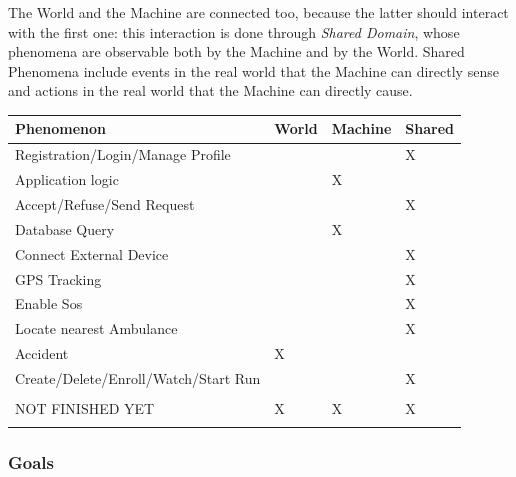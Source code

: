 \documentclass[a4paper]{article}
\begin{document}
        The World and the Machine are connected too, because the latter should interact with the first one: this interaction is done through \textit{Shared Domain}, whose phenomena are observable both by the Machine and by the World. Shared Phenomena include events in the real world that the Machine can directly sense and actions in the real world that the Machine can directly cause.
        \newpage
        \begin{table}[!htpb]
        \centering
        \begin{tabular}{|l|l|l|l|}
        \hline
         \textbf{Phenomenon} & \textbf{World} & \textbf{Machine} & \textbf{Shared}\\ \hline
         Registration/Login/Manage Profile & & & X \\ \hline
         Application logic & & X & \\ \hline
         Accept/Refuse/Send Request & & & X \\ \hline
         Database Query & & X & \\ \hline
         Connect External Device & & & X \\ \hline
         GPS Tracking & & & X \\ \hline
         Enable Sos & & & X \\ \hline
         Locate nearest Ambulance & & & X \\ \hline
         Accident & X & & \\ \hline
         Create/Delete/Enroll/Watch/Start Run & & & X \\ \hline
         & & & \\ \hline
         NOT FINISHED YET & X & X & X \\ \hline
         & & & \\ \hline
        \end{tabular}
        \end{table}
        
        \subsubsection{Goals}
        
\end{document}
